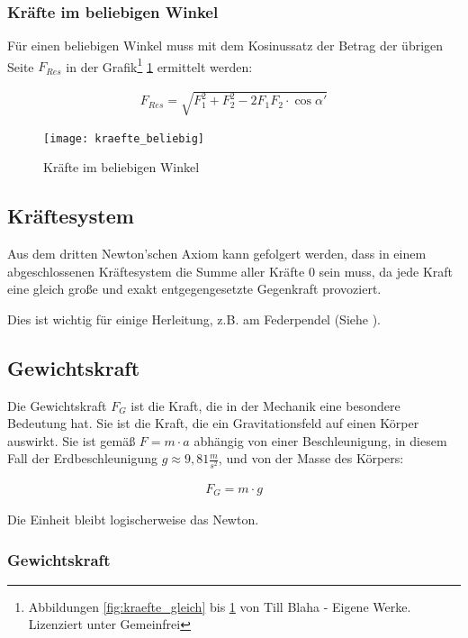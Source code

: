 \subsubsection{Kräfte im beliebigen Winkel}

\noindent Für einen beliebigen Winkel muss mit dem Kosinussatz der Betrag der übrigen Seite $F_{Res}$ in der Grafik\footnote{Abbildungen \ref{fig:kraefte_gleich} bis \ref{fig:kraefte_beliebig} von Till Blaha - Eigene Werke. Lizenziert unter Gemeinfrei} \ref{fig:kraefte_beliebig} ermittelt werden:

\begin{align}
	F_{Res} = \sqrt{F_1^2 + F_2^2 - 2F_1 F_2 \cdot \cos{\alpha '}}
\end{align}

\begin{figure}[h!]
	\centering
	\texttt{[image: kraefte\_beliebig]}
	\caption{Kräfte im beliebigen Winkel}
	\label{fig:kraefte_beliebig}
\end{figure}




\subsection{Kräftesystem}

Aus dem dritten Newton'schen Axiom kann gefolgert werden, dass in einem abgeschlossenen Kräftesystem die Summe aller Kräfte $0$ sein muss, da jede Kraft eine gleich große und exakt entgegengesetzte Gegenkraft provoziert.

Dies ist wichtig für einige Herleitung, z.B. am Federpendel (Siehe ).


\subsection{Gewichtskraft}

Die Gewichtskraft $F_{G}$ ist die Kraft, die in der Mechanik eine besondere Bedeutung hat. Sie ist die Kraft, die ein Gravitationsfeld auf einen Körper auswirkt. Sie ist gemäß $F = m \cdot a$ abhängig von einer Beschleunigung, in diesem Fall der Erdbeschleunigung $g \approx 9,81 \frac{m}{s^2}$, und von der Masse des Körpers:

\begin{align}
	F_{G} = m \cdot g
\end{align}

\noindent Die Einheit bleibt logischerweise das Newton.

\subsubsection{Gewichtskraft}
